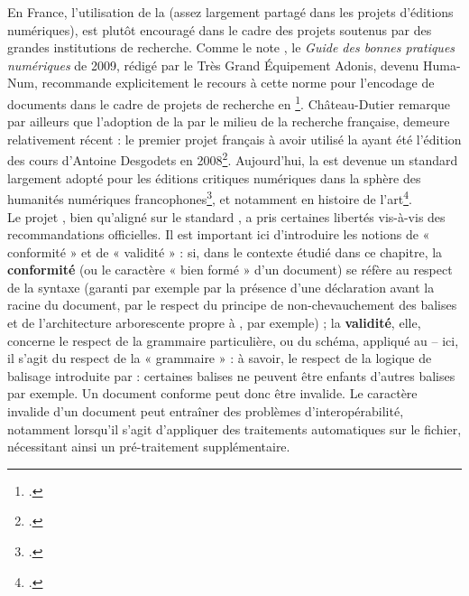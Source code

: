 En France, l’utilisation de la \tei (assez largement partagé dans les projets d’éditions numériques), est plutôt encouragé dans le cadre des projets soutenus par des grandes institutions de recherche. Comme le note \citeauthor{chateau-dutier_editions_2021}, le \textit{Guide des bonnes pratiques numériques} de 2009, rédigé par le Très Grand Équipement Adonis, devenu Huma-Num, recommande explicitement le recours à cette norme pour l’encodage de documents dans le cadre de projets de recherche en \shs\footcite{tge-adonis_guide_2009}. Château-Dutier remarque par ailleurs que l’adoption de la \tei par le milieu de la recherche française, demeure relativement récent : le premier projet français à avoir utilisé la \tei ayant été l’édition des cours d’Antoine Desgodets en 2008\footcite[p.81]{chateau-dutier_editions_2021}. Aujourd’hui, la \tei est devenue un standard largement adopté pour les éditions critiques numériques dans la sphère des humanités numériques francophones\footcite{blanc_feracci_quest-ce_2022}, et notamment en histoire de l’art\footcite[p.82]{chateau-dutier_editions_2021}.
\newline
{}\\

Le projet \pense, bien qu’aligné sur le standard \tei, a pris certaines libertés vis-à-vis des recommandations officielles. Il est important ici d’introduire les notions de « conformité » et de « validité » : si, dans le contexte étudié dans ce chapitre, la \textbf{conformité} (ou le caractère « bien formé » d’un document) se réfère au respect de la syntaxe \xml (garanti par exemple par la présence d’une déclaration \xml avant la racine du document, par le respect du principe de non-chevauchement des balises et de l’architecture arborescente propre à \xml, par exemple) ; la \textbf{validité}, elle, concerne le respect de la grammaire particulière, ou du schéma, appliqué au \xml – ici, il s’agit du respect de la « grammaire » \tei : à savoir, le respect de la logique de balisage introduite par \tei : certaines balises ne peuvent être enfants d’autres balises par exemple. Un document conforme peut donc être invalide. 
Le caractère invalide d’un document peut entraîner des problèmes d’interopérabilité, notamment lorsqu’il s’agit d’appliquer des traitements automatiques sur le fichier, nécessitant ainsi un pré-traitement supplémentaire. 

